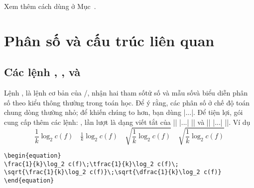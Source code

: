 \documentclass[11pt,leqno,titlepage,openany]{amsldoc}[1999/12/13]
\begin{document}
\medskip
Xem thêm cách dùng  ở Mục~.

\section{Phân số và cấu trúc liên quan}

\subsection{Các lệnh , , và }

Lệnh , là lệnh cơ bản của \latex/, nhận hai tham số\mdash tử số
và mẫu số\mdash và biểu diễn phân số theo kiểu thông thường trong toán học.
Để ý rằng, các phân số ở chế độ toán chung dòng thường nhỏ; để khiến chúng
to hơn, bạn dùng |\displaystyle\frac...|. Để tiện lợi,
gói  cung cấp thêm các lệnh: ,  lần lượt
là dạng viết tắt của |{\displaystyle\frac| |...| |}| và
|{\textstyle\frac| |...| |}|. Ví dụ
\begin{equation}
\frac{1}{k}\log_2 c(f)\quad\tfrac{1}{k}\log_2 c(f)\quad
\sqrt{\frac{1}{k}\log_2 c(f)}\quad\sqrt{\dfrac{1}{k}\log_2 c(f)}
\end{equation}
\begin{verbatim}
\begin{equation}
\frac{1}{k}\log_2 c(f)\;\tfrac{1}{k}\log_2 c(f)\;
\sqrt{\frac{1}{k}\log_2 c(f)}\;\sqrt{\dfrac{1}{k}\log_2 c(f)}
\end{equation}
\end{verbatim}

\end{document}

